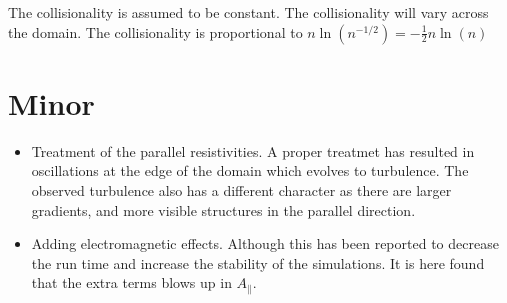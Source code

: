 The collisionality is assumed to be constant.
The collisionality will vary across the domain.
The collisionality is proportional to $n\ln(n^{-1/2})=-\frac{1}{2}n\ln(n)$

\section{Minor}

\begin{itemize}[noitemsep,nolistsep]
    \item Treatment of the parallel resistivities.
        A proper treatmet has resulted in oscillations at the edge of the domain which evolves to turbulence.
        The observed turbulence also has a different character as there are larger gradients, and more visible structures in the parallel direction.
    \item Adding electromagnetic effects.
        Although this has been reported to decrease the run time and increase the stability of the simulations.
        It is here found that the extra terms blows up in $A_\|$.
\end{itemize}
